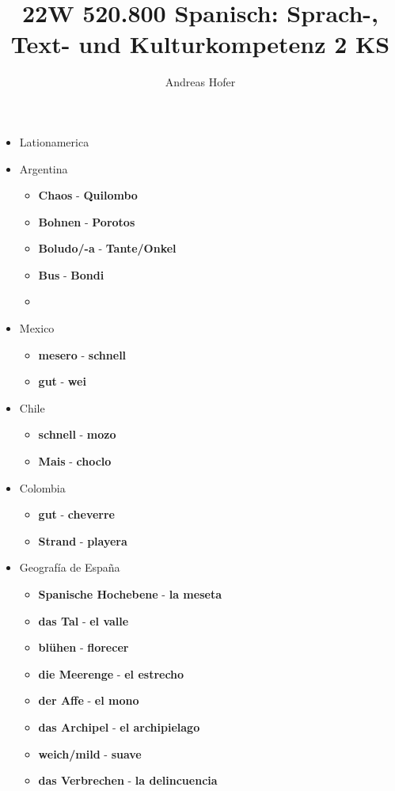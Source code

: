 \documentclass{article}
\title{\vspace{-3cm}22W 520.800 Spanisch: Sprach-, Text- und Kulturkompetenz 2 KS}
\author{Andreas Hofer}
\begin{document}
	\begin{multicols}{2}
	\begin{itemize}
		\item{Lationamerica}
		\item{Argentina}
		\begin{itemize}
			\item{\textbf{Chaos} - \textbf{Quilombo}}
			\item{\textbf{Bohnen} - \textbf{Porotos}}
			\item{\textbf{Boludo/-a} - \textbf{Tante/Onkel}}
			\item{\textbf{Bus} - \textbf{Bondi}}
			\item{\textbf{}}
		\end{itemize}
		\item{Mexico}
		\begin{itemize}
			\item{\textbf{mesero} - \textbf{schnell}}
			\item{\textbf{gut} - \textbf{wei}}
		\end{itemize}
		\item{Chile}
		\begin{itemize}
			\item{\textbf{schnell} - \textbf{mozo}}
			\item{\textbf{Mais} - \textbf{choclo}}
		\end{itemize}
		\item{Colombia}
		\begin{itemize}
			\item{\textbf{gut} - \textbf{cheverre}}
			\item{\textbf{Strand} - \textbf{playera}}
		\end{itemize}
		\item{Geografía de España}
		\begin{itemize}
			\item{\textbf{Spanische Hochebene} - \textbf{la meseta}}
			\item{\textbf{das Tal} - \textbf{el valle}}
			\item{\textbf{blühen} - \textbf{florecer}}
			\item{\textbf{die Meerenge} - \textbf{el estrecho}}
			\item{\textbf{der Affe} - \textbf{el mono}}
			\item{\textbf{das Archipel} - \textbf{el archipielago}}
			\item{\textbf{weich/mild} - \textbf{suave}}
			\item{\textbf{das Verbrechen} - \textbf{la delincuencia}}

\end{itemize}
\end{itemize}
\end{multicols}
\end{document}
